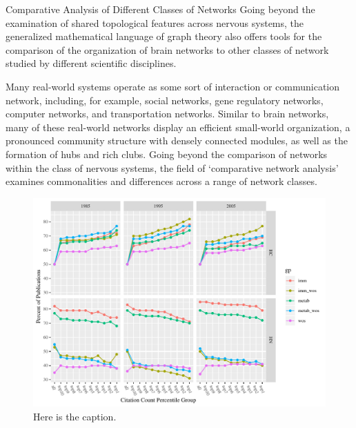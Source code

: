 \documentclass[NETN]{stjour}
\begin{document}
\begin{boxedtext}{Comparative Analysis of Different Classes of Networks} 
Going beyond the examination of shared topological features across
nervous systems, the generalized mathematical language of graph theory
also offers tools for the comparison of the organization of brain
networks to other classes of network studied
by different scientific
disciplines. 

Many real-world systems operate as some sort of
interaction or communication network, including, for example, social
networks, gene regulatory networks, computer networks, and
transportation networks. Similar to brain networks, many of these
real-world networks display an efficient small-world organization, a
pronounced community structure with densely connected modules, as well
as the formation of hubs and rich clubs. Going beyond the
comparison of networks within the class of nervous systems, the field
of `comparative network analysis' examines commonalities and
differences across a range of network classes.

\begin{figure}
\includegraphics[width=\hsize]{Fig1}
\caption{Here is the caption.}
\end{figure}
\end{boxedtext}
\end{document}
